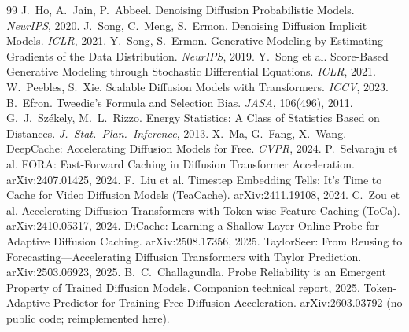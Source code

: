 \documentclass[10pt,twocolumn]{article}
\begin{document}
\begin{thebibliography}{99}\small
{} J.~Ho, A.~Jain, P.~Abbeel. Denoising Diffusion Probabilistic Models. \emph{NeurIPS}, 2020.
 J.~Song, C.~Meng, S.~Ermon. Denoising Diffusion Implicit Models. \emph{ICLR}, 2021.
 Y.~Song, S.~Ermon. Generative Modeling by Estimating Gradients of the Data Distribution. \emph{NeurIPS}, 2019.
 Y.~Song et al. Score-Based Generative Modeling through Stochastic Differential Equations. \emph{ICLR}, 2021.
 W.~Peebles, S.~Xie. Scalable Diffusion Models with Transformers. \emph{ICCV}, 2023.
 B.~Efron. Tweedie's Formula and Selection Bias. \emph{JASA}, 106(496), 2011.
 G.~J.~Sz\'ekely, M.~L.~Rizzo. Energy Statistics: A Class of Statistics Based on Distances. \emph{J.\ Stat.\ Plan.\ Inference}, 2013.
 X.~Ma, G.~Fang, X.~Wang. DeepCache: Accelerating Diffusion Models for Free. \emph{CVPR}, 2024.
 P.~Selvaraju et al. FORA: Fast-Forward Caching in Diffusion Transformer Acceleration. arXiv:2407.01425, 2024.
 F.~Liu et al. Timestep Embedding Tells: It's Time to Cache for Video Diffusion Models (TeaCache). arXiv:2411.19108, 2024.
 C.~Zou et al. Accelerating Diffusion Transformers with Token-wise Feature Caching (ToCa). arXiv:2410.05317, 2024.
 DiCache: Learning a Shallow-Layer Online Probe for Adaptive Diffusion Caching. arXiv:2508.17356, 2025.
 TaylorSeer: From Reusing to Forecasting---Accelerating Diffusion Transformers with Taylor Prediction. arXiv:2503.06923, 2025.
 B.~C.~Challagundla. Probe Reliability is an Emergent Property of Trained Diffusion Models. Companion technical report, 2025.
 Token-Adaptive Predictor for Training-Free Diffusion Acceleration. arXiv:2603.03792 (no public code; reimplemented here).
\end{thebibliography}
\end{document}
